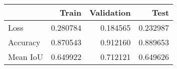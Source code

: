 \begin{tabular}{lrrr}
\toprule
 & Train & Validation & Test \\
\midrule
Loss & 0.280784 & 0.184565 & 0.232987 \\
Accuracy & 0.870543 & 0.912160 & 0.889653 \\
Mean IoU & 0.649922 & 0.712121 & 0.649626 \\
\bottomrule
\end{tabular}
